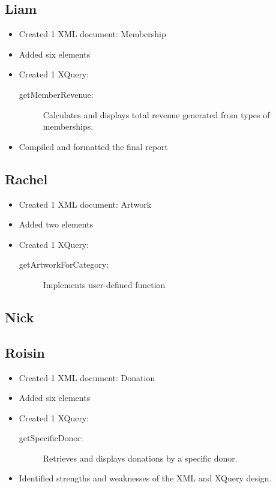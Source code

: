\documentclass{article} %
\begin{document}
\subsection{Liam}
\begin{itemize}
    \item Created 1 XML document: Membership
    \item Added six elements
    \item Created 1 XQuery: 
    \begin{description}
        \item [getMemberRevenue:] Calculates and displays total revenue generated from types of memberships.
    \end{description}
    \item Compiled and formatted the final report
\end{itemize}

\subsection{Rachel}
\begin{itemize}
    \item Created 1 XML document: Artwork
    \item Added two elements
    \item Created 1 XQuery: 
    \begin{description}
        \item[getArtworkForCategory:] Implements user-defined function
    \end{description}
\end{itemize}

\subsection{Nick}

\subsection{Roisin}
\begin{itemize}
    \item Created 1 XML document: Donation
    \item Added six elements 
    \item Created 1 XQuery: 
    \begin{description}
        \item[getSpecificDonor:] Retrieves and displays donations by a specific donor.
    \end{description}
    \item Identified strengths and weaknesses of the XML and XQuery design.
\end{itemize}
\end{document}
